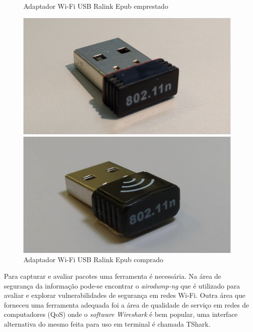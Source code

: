 \begin{figure}[htb]
 \label{adaptadores-usb-2}
  \begin{minipage}{0.45\textwidth}
	  \centering
	  \caption{Adaptador Wi-Fi USB Ralink Epub emprestado \label{fig-ralink-epub}}
	  \includegraphics[width=1\textwidth]{040-plataformas/RPi-WiFi-dongles/cut_ralink-epub.jpg}
  \end{minipage}
  \hfill
  \begin{minipage}{0.45\textwidth}
	  \centering
	  \caption{Adaptador Wi-Fi USB Ralink Epub comprado \label{fig-ralink}}
	  \includegraphics[width=1\textwidth]{040-plataformas/RPi-WiFi-dongles/cut_ralink.jpg}
  \end{minipage}
\end{figure}


Para capturar e avaliar pacotes uma ferramenta é necessária. Na área
de segurança da informação pode-se encontrar o \emph{airodump-ng} que é utilizado para
avaliar e explorar vulnerabilidades de segurança em redes Wi-Fi. Outra área que
forneceu uma ferramenta adequada foi a área de qualidade de serviço em redes de
computadores (QoS) onde o \emph{software Wireshark} é bem popular, uma interface alternativa
do mesmo feita para uso em terminal é chamada TShark.

